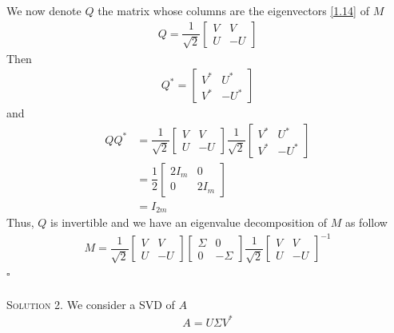 \documentclass[a4paper,oneside]{book}
\numberwithin{equation}{chapter}
\begin{document}
We now denote $Q$ the matrix whose columns are the eigenvectors \eqref{1.14} of $M$
\begin{align}
Q = \dfrac{1}{{\sqrt 2 }}\left[ {\begin{array}{*{20}{c}}
V&{  V}\\
U& -U
\end{array}} \right]
\end{align}
Then
\begin{align}
{Q^*} = \left[ {\begin{array}{*{20}{c}}
{{V^*}}&{{U^*}}\\
{ {V^*}}&{-{U^*}}
\end{array}} \right]
\end{align}
and
\begin{align}
Q{Q^*} &= \dfrac{1}{{\sqrt 2 }}\left[ {\begin{array}{*{20}{c}}
V&V\\
U&{ - U}
\end{array}} \right]\dfrac{1}{{\sqrt 2 }}\left[ {\begin{array}{*{20}{c}}
{{V^*}}&{{U^*}}\\
{{V^*}}&{ - {U^*}}
\end{array}} \right]\\
 &= \dfrac{1}{2}\left[ {\begin{array}{*{20}{c}}
{2{I_m}}&0\\
0&{2{I_m}}
\end{array}} \right]\\
& = {I_{2m}}
\end{align}
Thus, $Q$ is invertible and we have an eigenvalue decomposition of $M$ as follow
\begin{align}
M = \dfrac{1}{{\sqrt 2 }}\left[ {\begin{array}{*{20}{c}}
V&V\\
U&{ - U}
\end{array}} \right]\left[ {\begin{array}{*{20}{c}}
\Sigma &0\\
0&{ - \Sigma }
\end{array}} \right]\dfrac{1}{{\sqrt 2 }}{\left[ {\begin{array}{*{20}{c}}
V&V\\
U&{ - U}
\end{array}} \right]^{ - 1}}
\end{align}
\hfill $\square$\\
\\
\textsc{Solution 2.} We consider a SVD of $A$
\begin{align}
A=U\Sigma V^*
\end{align}
\end{document}
